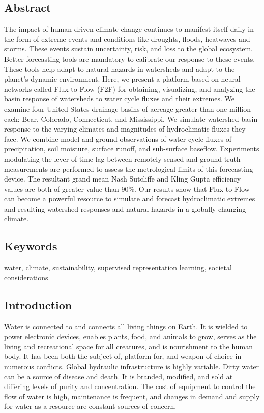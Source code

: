 \begin{refsection}
\subsection{Abstract}
The impact of human driven climate change continues to manifest itself daily in the form of extreme events and conditions like droughts, floods, heatwaves and storms. These events sustain uncertainty, risk, and loss to the global ecosystem. Better forecasting tools are mandatory to calibrate our response to these events. These tools help adapt to natural hazards in watersheds and adapt to the planet’s dynamic environment. Here, we present a platform based on neural networks called Flux to Flow (F2F) for obtaining, visualizing, and analyzing the basin response of watersheds to water cycle fluxes and their extremes. We examine four United States drainage basins of acreage greater than one million each: Bear, Colorado, Connecticut, and Mississippi. We simulate watershed basin response to the varying climates and magnitudes of hydroclimatic fluxes they face. We combine model and ground observations of water cycle fluxes of precipitation, soil moisture, surface runoff, and sub-surface baseflow. Experiments modulating the lever of time lag between remotely sensed and ground truth measurements are performed to assess the metrological limits of this forecasting device. The resultant grand mean Nash Sutcliffe and Kling Gupta efficiency values are both of greater value than 90\%. Our results show that Flux to Flow can become a powerful resource to simulate and forecast hydroclimatic extremes and resulting watershed responses and natural hazards in a globally changing climate.

\subsection{Keywords}
water, climate, sustainability, supervised representation learning, societal considerations
\subsection{Introduction}
Water is connected to and connects all living things on Earth. It is wielded to power electronic devices, enables plants, food, and animals to grow, serves as the living and recreational space for all creatures, and is nourishment to the human body. It has been both the subject of, platform for, and weapon of choice in numerous conflicts. Global hydraulic infrastructure is highly variable. Dirty water can be a source of disease and death. It is branded, modified, and sold at differing levels of purity and concentration. The cost of equipment to control the flow of water is high, maintenance is frequent, and changes in demand and supply for water as a resource are constant sources of concern. 


\end{refsection}
